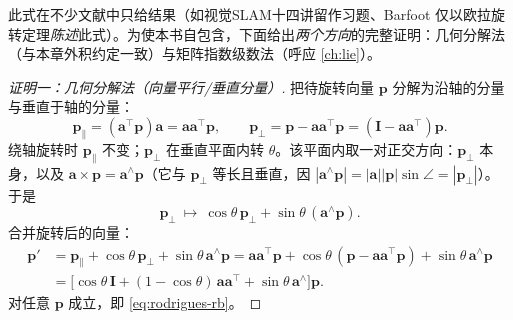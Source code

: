 \noindent 此式在不少文献中只给结果（如视觉SLAM十四讲留作习题\cite{gaoxiang2019slam14}、Barfoot 仅以欧拉旋转定理\emph{陈述}此式\cite{barfoot2024state}）。为使本书自包含，下面给出\emph{两个方向}的完整证明：几何分解法（与本章外积约定一致）与矩阵指数级数法（呼应 \cref{ch:lie}）。

\begin{proof}[证明一：几何分解法（向量平行/垂直分量）]
把待旋转向量 $\mathbf{p}$ 分解为沿轴的分量与垂直于轴的分量：
\[
  \mathbf{p}_\parallel=(\mathbf{a}^\top\mathbf{p})\mathbf{a}=\mathbf{a}\mathbf{a}^\top\mathbf{p},\qquad
  \mathbf{p}_\perp=\mathbf{p}-\mathbf{a}\mathbf{a}^\top\mathbf{p}=(\mathbf{I}-\mathbf{a}\mathbf{a}^\top)\mathbf{p}.
\]
绕轴旋转时 $\mathbf{p}_\parallel$ 不变；$\mathbf{p}_\perp$ 在垂直平面内转 $\theta$。该平面内取一对正交方向：$\mathbf{p}_\perp$ 本身，以及 $\mathbf{a}\times\mathbf{p}=\mathbf{a}^\wedge\mathbf{p}$（它与 $\mathbf{p}_\perp$ 等长且垂直，因 $|\mathbf{a}^\wedge\mathbf{p}|=|\mathbf{a}||\mathbf{p}|\sin\angle=|\mathbf{p}_\perp|$）。于是
\[
  \mathbf{p}_\perp\ \longmapsto\ \cos\theta\,\mathbf{p}_\perp+\sin\theta\,(\mathbf{a}^\wedge\mathbf{p}).
\]
合并旋转后的向量：
\begin{align*}
  \mathbf{p}'&=\mathbf{p}_\parallel+\cos\theta\,\mathbf{p}_\perp+\sin\theta\,\mathbf{a}^\wedge\mathbf{p}
   =\mathbf{a}\mathbf{a}^\top\mathbf{p}+\cos\theta\,(\mathbf{p}-\mathbf{a}\mathbf{a}^\top\mathbf{p})+\sin\theta\,\mathbf{a}^\wedge\mathbf{p}\\
  &=\big[\cos\theta\,\mathbf{I}+(1-\cos\theta)\,\mathbf{a}\mathbf{a}^\top+\sin\theta\,\mathbf{a}^\wedge\big]\mathbf{p}.
\end{align*}
对任意 $\mathbf{p}$ 成立，即 \cref{eq:rodrigues-rb}。
\end{proof}


